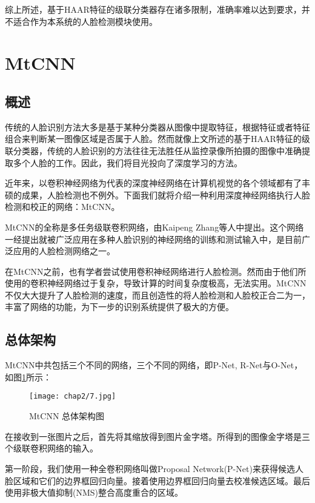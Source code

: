 综上所述，基于HAAR特征的级联分类器存在诸多限制，准确率难以达到要求，并不适合作为本系统的人脸检测模块使用。

\section{MtCNN}

\subsection{概述}

传统的人脸识别方法大多是基于某种分类器从图像中提取特征，根据特征或者特征组合来判断某一图像区域是否属于人脸。然而就像上文所述的基于HAAR特征的级联分类器，传统的人脸识别的方法往往无法胜任从监控录像所拍摄的图像中准确提取多个人脸的工作。因此，我们将目光投向了深度学习的方法。

近年来，以卷积神经网络为代表的深度神经网络在计算机视觉的各个领域都有了丰硕的成果，人脸检测也不例外。下面我们就将介绍一种利用深度神经网络执行人脸检测和校正的网络：MtCNN\cite{zhang2016joint}。

MtCNN的全称是多任务级联卷积网络，由Kaipeng Zhang等人中提出。这个网络一经提出就被广泛应用在多种人脸识别的神经网络的训练和测试输入中，是目前广泛应用的人脸检测网络之一。

在MtCNN之前，也有学者尝试使用卷积神经网络进行人脸检测。然而由于他们所使用的卷积神经网络过于复杂，导致计算的时间复杂度极高，无法实用\cite{yang2015facial}。MtCNN不仅大大提升了人脸检测的速度，而且创造性的将人脸检测和人脸校正合二为一，丰富了网络的功能，为下一步的识别系统提供了极大的方便。

\subsection{总体架构}

MtCNN中共包括三个不同的网络，三个不同的网络，即P-Net, R-Net与O-Net，如图\ref{fig:mtcnn}\cite{zhang2016joint}所示：

\begin{figure}[!htp]
	\centering
	\texttt{[image: chap2/7.jpg]}
	\caption{MtCNN 总体架构图\cite{zhang2016joint}}
	\label{fig:mtcnn}
\end{figure}

在接收到一张图片之后，首先将其缩放得到图片金字塔。所得到的图像金字塔是三个级联卷积网络的输入。

第一阶段，我们使用一种全卷积网络叫做Proposal Network(P-Net)来获得候选人脸区域和它们的边界框回归向量。接着使用边界框回归向量去校准候选区域。最后使用非极大值抑制(NMS)整合高度重合的区域。


